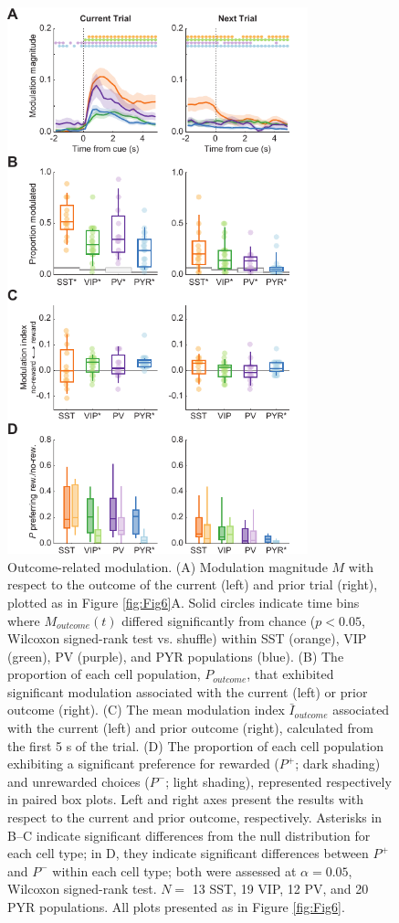 \begin{figure}[htp]

\begin{center}
\includegraphics[width=8.7cm]{Figures/Chapter4/Fig7}
\end{center}

\caption[Outcome-related modulation]
{Outcome-related modulation. (A) Modulation magnitude $M$ with respect to the outcome of the current (left) and prior trial (right), plotted as in Figure \ref{fig:Fig6}A. Solid circles indicate time bins where $M_{\mathit{outcome}}(t)$ differed significantly from chance ($p<0.05$, Wilcoxon signed-rank test vs. shuffle) within SST (orange), VIP (green), PV (purple), and PYR populations (blue). (B) The proportion of each cell population, $P_{\mathit{outcome}}$, that exhibited significant modulation associated with the current (left) or prior outcome (right). (C) The mean modulation index $\bar{I}_{\mathit{outcome}}$ associated with the current (left) and prior outcome (right), calculated from the first 5 s of the trial. (D) The proportion of each cell population exhibiting a significant preference for rewarded ($P^+$; dark shading) and unrewarded choices ($P^-$; light shading), represented respectively in paired box plots. Left and right axes present the results with respect to the current and prior outcome, respectively. Asterisks in B--C indicate significant differences from the null distribution for each cell type; in D, they indicate significant differences between $P^+$ and $P^-$ within each cell type; both were assessed at $\alpha = 0.05$, Wilcoxon signed-rank test. $N=$ 13 SST, 19 VIP, 12 PV, and 20 PYR populations. All plots presented as in Figure \ref{fig:Fig6}.}


\end{figure}
